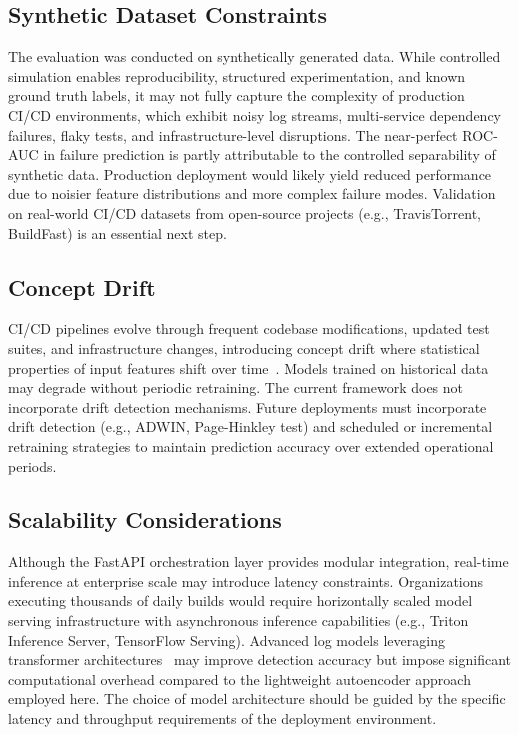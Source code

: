 \documentclass[a4paper,fleqn]{cas-dc}
\begin{document}
\subsection{Synthetic Dataset Constraints}\label{subsec:synthetic}

The evaluation was conducted on synthetically generated data.
While controlled simulation enables reproducibility, structured experimentation, and known ground truth labels, it may not fully capture the complexity of production CI/CD environments, which exhibit noisy log streams, multi-service dependency failures, flaky tests, and infrastructure-level disruptions.
The near-perfect ROC-AUC in failure prediction is partly attributable to the controlled separability of synthetic data.
Production deployment would likely yield reduced performance due to noisier feature distributions and more complex failure modes.
Validation on real-world CI/CD datasets from open-source projects (e.g., TravisTorrent, BuildFast) is an essential next step.

\subsection{Concept Drift}\label{subsec:drift}

CI/CD pipelines evolve through frequent codebase modifications, updated test suites, and infrastructure changes, introducing concept drift where statistical properties of input features shift over time~\citep{bayram2025trustworthy, abdullahi2025conceptdrift}.
Models trained on historical data may degrade without periodic retraining. The current framework does not incorporate drift detection mechanisms.
Future deployments must incorporate drift detection (e.g., ADWIN, Page-Hinkley test) and scheduled or incremental retraining strategies to maintain prediction accuracy over extended operational periods.

\subsection{Scalability Considerations}\label{subsec:scalability}

Although the FastAPI orchestration layer provides modular integration, real-time inference at enterprise scale may introduce latency constraints.
Organizations executing thousands of daily builds would require horizontally scaled model serving infrastructure with asynchronous inference capabilities (e.g., Triton Inference Server, TensorFlow Serving).
Advanced log models leveraging transformer architectures~\citep{liao2025logtransformer, vaswani2017attention} may improve detection accuracy but impose significant computational overhead compared to the lightweight autoencoder approach employed here.
The choice of model architecture should be guided by the specific latency and throughput requirements of the deployment environment.
\end{document}

